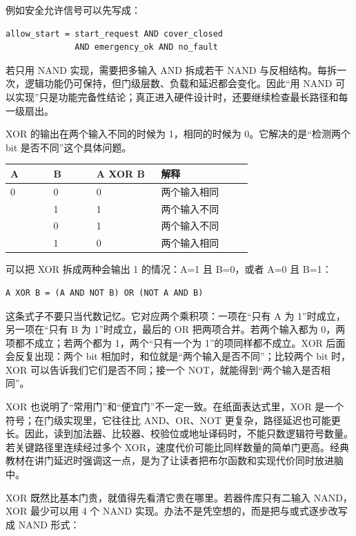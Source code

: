 例如安全允许信号可以先写成：

\begin{lstlisting}
allow_start = start_request AND cover_closed
              AND emergency_ok AND no_fault
\end{lstlisting}

若只用 NAND 实现，需要把多输入 AND 拆成若干 NAND 与反相结构。每拆一次，逻辑功能仍可保持，但门级层数、负载和延迟都会变化。因此“用 NAND 可以实现”只是功能完备性结论；真正进入硬件设计时，还要继续检查最长路径和每一级扇出。

XOR 的输出在两个输入不同的时候为 1，相同的时候为 0。它解决的是“检测两个 bit 是否不同”这个具体问题。

\begin{longtable}{L{0.16\linewidth}L{0.16\linewidth}L{0.24\linewidth}L{0.34\linewidth}}
\toprule
A & B & A XOR B & 解释 \\
 & 0 & 0 & 两个输入相同 \\ & 1 & 1 & 两个输入不同 \\ & 0 & 1 & 两个输入不同 \\ & 1 & 0 & 两个输入相同 \\
\bottomrule
\end{longtable}

可以把 XOR 拆成两种会输出 1 的情况：A=1 且 B=0，或者 A=0 且 B=1：

\begin{lstlisting}
A XOR B = (A AND NOT B) OR (NOT A AND B)
\end{lstlisting}

这条式子不要只当代数记忆。它对应两个乘积项：一项在“只有 A 为 1”时成立，另一项在“只有 B 为 1”时成立，最后的 OR 把两项合并。若两个输入都为 0，两项都不成立；若两个都为 1，两个“只有一个为 1”的项同样都不成立。XOR 后面会反复出现：两个 bit 相加时，和位就是“两个输入是否不同”；比较两个 bit 时，XOR 可以告诉我们它们是否不同；接一个 NOT，就能得到“两个输入是否相同”。

XOR 也说明了“常用门”和“便宜门”不一定一致。在纸面表达式里，XOR 是一个符号；在门级实现里，它往往比 AND、OR、NOT 更复杂，路径延迟也可能更长。因此，读到加法器、比较器、校验位或地址译码时，不能只数逻辑符号数量。若关键路径里连续经过多个 XOR，速度代价可能比同样数量的简单门更高。经典教材在讲门延迟时强调这一点，是为了让读者把布尔函数和实现代价同时放进脑中。

XOR 既然比基本门贵，就值得先看清它贵在哪里。若器件库只有二输入 NAND，XOR 最少可以用 4 个 NAND 实现。办法不是凭空想的，而是把与或式逐步改写成 NAND 形式：

